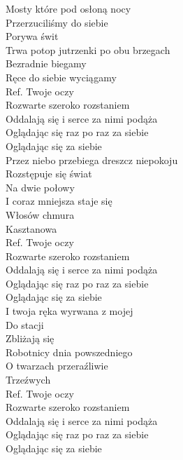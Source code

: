 
\begin{flushleft}
Mosty które pod osłoną nocy \tab{} \\
Przerzuciliśmy do siebie  \tab{}\\
Porywa świt  \tab{}\tab{}\\
Trwa potop jutrzenki po obu brzegach \\
Bezradnie biegamy \tab{}\\
Ręce do siebie wyciągamy \tab{} \\
\vskip 3mm
Ref. Twoje oczy \tab{}\\
\hspace{0.9cm}Rozwarte szeroko rozstaniem \\
\hspace{0.9cm}Oddalają się i serce za nimi podąża \\
\hspace{0.9cm}Oglądając się raz po raz za siebie \\
\hspace{0.9cm}Oglądając się za siebie \tab{}\\
\vskip 3mm
Przez niebo przebiega dreszcz niepokoju \\
Rozstępuje się świat \\
Na dwie połowy \\
I coraz mniejsza staje się \\
Włosów chmura \\
Kasztanowa \\
\vskip 3mm
Ref. Twoje oczy\\
\hspace{0.9cm}Rozwarte szeroko rozstaniem \\
\hspace{0.9cm}Oddalają się i serce za nimi podąża \\
\hspace{0.9cm}Oglądając się raz po raz za siebie \\
\hspace{0.9cm}Oglądając się za siebie \\
\vskip 3mm
I twoja ręka wyrwana z mojej \\
Do stacji \\
Zbliżają się \\
Robotnicy dnia powszedniego \\
O twarzach przeraźliwie \\
Trzeźwych \\
\vskip 3mm
Ref. Twoje oczy\\
\hspace{0.9cm}Rozwarte szeroko rozstaniem \\
\hspace{0.9cm}Oddalają się i serce za nimi podąża \\
\hspace{0.9cm}Oglądając się raz po raz za siebie \\
\hspace{0.9cm}Oglądając się za siebie \\
\end{flushleft}
\clearpage
